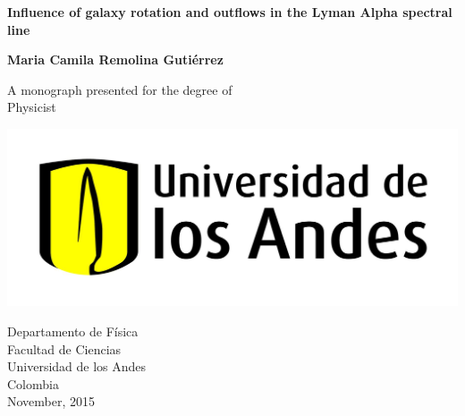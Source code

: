 

\setcounter{page}{1}

\newpage

\thispagestyle{empty}
\begin{center}
  \vspace*{1cm}
  {\Huge \bf Influence of galaxy rotation and outflows in the Lyman Alpha spectral line}

  \vspace*{2cm}
  {\LARGE\bf Maria Camila Remolina Guti\'errez}

  \vfill

  {\Large A monograph presented for the degree of\\
         [1mm] Physicist}
  \vspace*{0.9cm}
  
   \begin{center}
   \includegraphics[scale=0.12]{figures/uniandes.jpg}
   \end{center}

  {\large Departamento de F\'isica\\
		  [-3mm] Facultad de Ciencias\\
          [-3mm] Universidad de los Andes\\
          [-3mm] Colombia\\
          [1mm]  November, 2015}

\end{center}

